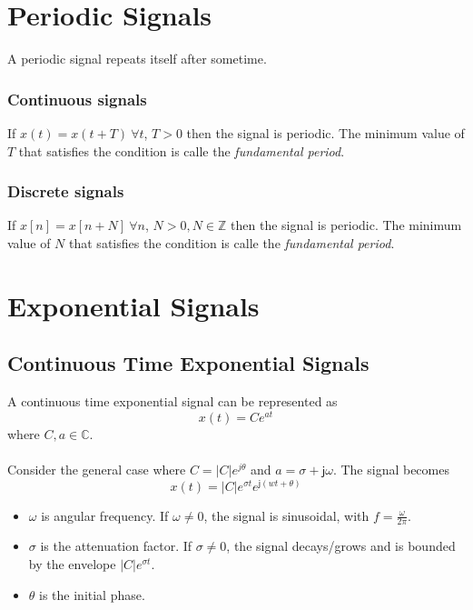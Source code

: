 \documentclass[oneside]{book}
\begin{document}
\section{Periodic Signals}
A periodic signal repeats itself after sometime.
\subsubsection{Continuous signals}
If
\(
x(t) = x(t + T)\ \forall t
\), \(T>0\)
then the signal is periodic. The minimum value of $T$ that satisfies the condition is calle the \textit{fundamental period}.
\subsubsection{Discrete signals}
If
\(
x[n] = x[n + N]\ \forall n
\), \(N>0, N\in\mathbb{Z}\)
then the signal is periodic. The minimum value of $N$ that satisfies the condition is calle the \textit{fundamental period}.

\section{Exponential Signals}
\subsection{Continuous Time Exponential Signals}
A continuous time exponential signal can be represented as
\begin{equation}
  x(t) = Ce^{at}
\end{equation}
where \(C, a \in \mathbb{C}\).
\\\\
\noindent \cite{continuous_time_exponential_general_case}Consider the general case where \(C = |C|e^{j\theta}\) and \(a = \sigma + \mathsf{j}\omega\). The signal becomes
\[
  x(t) = |C|e^{\sigma t}e^{\mathsf{j}(wt + \theta)}
\]
\begin{itemize}
  \item $\omega$ is angular frequency. If \(\omega \neq 0\), the signal is sinusoidal, with \(f = \frac{\omega}{2\pi}\).
  \item $\sigma$ is the attenuation factor. If \(\sigma \neq 0\), the signal decays/grows and is bounded by the envelope \(|C|e^{\sigma t}\).
  \item $\theta$ is the initial phase.
\end{itemize}
\end{document}
